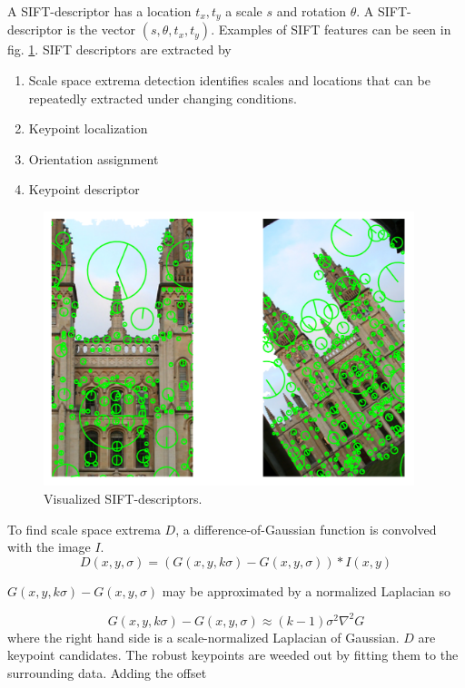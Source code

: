 \documentclass[english,12pt,a4paper,pdftex,elec,utf8, table]{aaltothesis}
\begin{document}
A SIFT-descriptor has a location $t_x, t_y$ a scale $s$ and rotation $\theta$. A SIFT-descriptor is the vector $(s, \theta, t_x, t_y)$. Examples of SIFT features can be seen in fig. \ref{siftfeatures}. SIFT descriptors are extracted by

\begin{enumerate}
\item Scale space extrema detection identifies scales and locations that can be repeatedly extracted under changing conditions.
\item Keypoint localization
\item Orientation assignment
\item Keypoint descriptor
\end{enumerate}
\cite{Lowe2004}

\begin{figure}[htb]
\begin{center}
\includegraphics[height=8cm]{figures/siftDescriptor}
\end{center}
\caption{Visualized SIFT-descriptors.}
\label{siftfeatures}
\end{figure}

To find scale space extrema $D$, a difference-of-Gaussian function is convolved with the image $I$.
\begin{equation}\label{keypoints}
  D(x,y,\sigma) = (G(x,y,k\sigma) - G(x, y, \sigma))*I(x,y)
\end{equation}\cite{Lowe2004}

$G(x,y,k\sigma) - G(x, y, \sigma)$ may be approximated by a normalized Laplacian so

\begin{equation}\label{approximatedog}
G(x,y,k\sigma) - G(x, y, \sigma) \approx (k - 1)\sigma^{2}\nabla^{2}G
\end{equation}\cite{Lowe2004}
where the right hand side is a scale-normalized Laplacian of Gaussian. $D$ are keypoint candidates. The robust keypoints are weeded out by fitting them to the surrounding data. \cite{Lowe2004} Adding the offset
\end{document}
